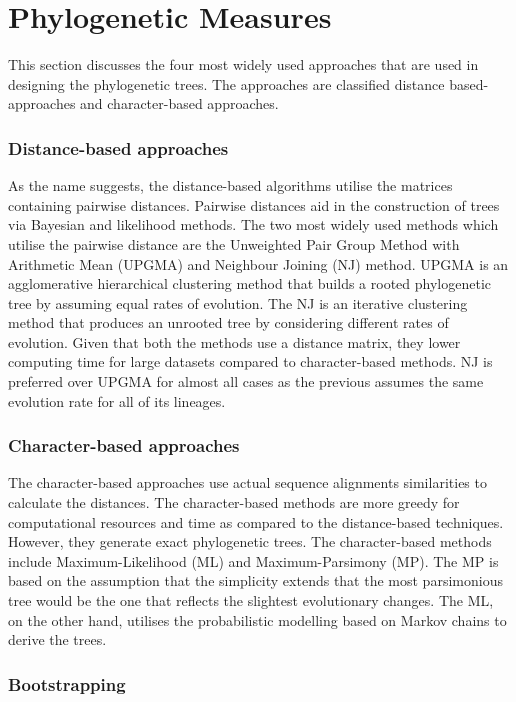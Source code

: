 \chapter{Phylogenetic Measures}
 \setcounter{page}{16}

This section discusses the four most widely used approaches that are used in designing the phylogenetic trees. The approaches are classified distance based-approaches and character-based approaches.

\subsection{Distance-based approaches}

As the name suggests, the distance-based algorithms utilise the matrices containing pairwise distances. Pairwise distances aid in the construction of trees via Bayesian and likelihood methods. The two most widely used methods which utilise the pairwise distance are the Unweighted Pair Group Method with Arithmetic Mean (UPGMA) and Neighbour Joining (NJ) method. UPGMA is an agglomerative hierarchical clustering method that builds a rooted phylogenetic tree by assuming equal rates of evolution. The NJ is an iterative clustering method that produces an unrooted tree by considering different rates of evolution. Given that both the methods use a distance matrix, they lower computing time for large datasets compared to character-based methods. NJ is preferred over UPGMA for almost all cases as the previous assumes the same evolution rate for all of its lineages.

\subsection{Character-based approaches}

The character-based approaches use actual sequence alignments similarities to calculate the distances. The character-based methods are more greedy for computational resources and time as compared to the distance-based techniques. However, they generate exact phylogenetic trees. The character-based methods include Maximum-Likelihood (ML) and Maximum-Parsimony (MP). The MP is based on the assumption that the simplicity extends that the most parsimonious tree would be the one that reflects the slightest evolutionary changes. The ML, on the other hand, utilises the probabilistic modelling based on Markov chains to derive the trees.

\subsection{Bootstrapping}

